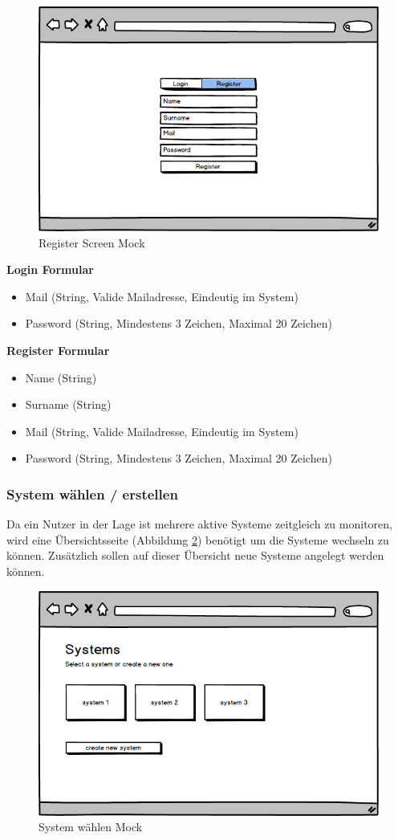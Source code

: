 \begin{figure}[h]
 \centering
 \includegraphics[width=0.7\linewidth]{kapitel1/mocks/Register.png}
 \caption{Register Screen Mock}
  \label{fig:register}
\end{figure}


\textbf{Login Formular}
\begin{itemize}
\item Mail (String, Valide Mailadresse, Eindeutig im System)
\item Password (String, Mindestens 3 Zeichen, Maximal 20 Zeichen)
\end{itemize}

\textbf{Register Formular}
\begin{itemize}
\item Name (String)
\item Surname (String)
\item Mail (String, Valide Mailadresse, Eindeutig im System)
\item Password (String, Mindestens 3 Zeichen, Maximal 20 Zeichen)
\end{itemize}



\subsubsection{System wählen / erstellen}

Da ein Nutzer in der Lage ist mehrere aktive Systeme zeitgleich zu monitoren,
wird eine Übersichtsseite (Abbildung \ref{fig:system-picker}) benötigt
um die Systeme wechseln zu können. Zusätzlich sollen auf dieser Übersicht
neue Systeme angelegt werden können.

\begin{figure}[h]
 \centering
 \includegraphics[width=0.6\linewidth]{kapitel1/mocks/system-picker.png}
 \caption{System wählen Mock}
 \label{fig:system-picker}
\end{figure}

